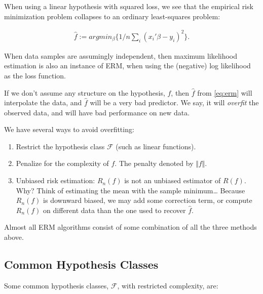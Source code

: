 \documentclass[]{book}
\providecommand{\tightlist}{%
  \setlength{\itemsep}{0pt}\setlength{\parskip}{0pt}}
\theoremstyle{definition}
\theoremstyle{definition}
\theoremstyle{definition}
\theoremstyle{remark}
\begin{document}
When using a linear hypothesis with squared loss, we see that the
empirical risk minimization problem collapses to an ordinary
least-squares problem:

\begin{align}
  \hat f := argmin_\beta \{1/n \sum_i (x_i'\beta - y_i)^2 \}.
\end{align}

When data samples are assumingly independent, then maximum likelihood
estimation is also an instance of ERM, when using the (negative) log
likelihood as the loss function.

If we don't assume any structure on the hypothesis, \(f\), then
\(\hat f\) from \eqref{eq:erm} will interpolate the data, and \(\hat f\)
will be a very bad predictor. We say, it will \emph{overfit} the
observed data, and will have bad performance on new data.

We have several ways to avoid overfitting:

\begin{enumerate}
\def\labelenumi{\arabic{enumi}.}
\tightlist
\item
  Restrict the hypothesis class \(\mathcal{F}\) (such as linear
  functions).
\item
  Penalize for the complexity of \(f\). The penalty denoted by
  \(\Vert f \Vert\).
\item
  Unbiased risk estimation: \(R_n(f)\) is not an unbiased estimator of
  \(R(f)\). Why? Think of estimating the mean with the sample
  minimum\ldots{} Because \(R_n(f)\) is downward biased, we may add some
  correction term, or compute \(R_n(f)\) on different data than the one
  used to recover \(\hat f\).
\end{enumerate}

Almost all ERM algorithms consist of some combination of all the three
methods above.

\subsection{Common Hypothesis Classes}\label{common-hypothesis-classes}

Some common hypothesis classes, \(\mathcal{F}\), with restricted
complexity, are:
\end{document}
